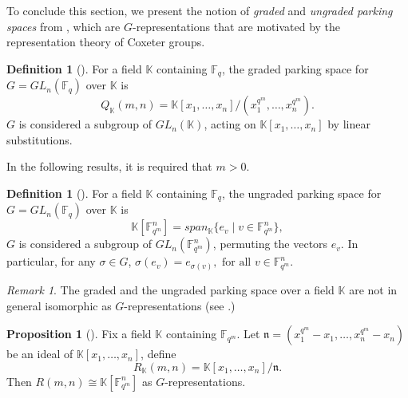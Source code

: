 \documentclass[12pt,a4paper]{report}
\theoremstyle{definition}
\newtheorem{definition}[theorem]{Definition}
\newtheorem{proposition}[theorem]{Proposition}
\theoremstyle{remark}
\newtheorem*{remark}{Remark}
\theoremstyle{definition}
\begin{document}
To conclude this section, we present the notion of \emph{graded} and \emph{ungraded parking spaces} from \cite[Section 6]{Lewis_Reiner_Stanton_2017}, which are $G$-representations that are motivated by the representation theory of Coxeter groups. 
\begin{definition}[{\cite[Definition 6.1]{Lewis_Reiner_Stanton_2017}}]\label{def:graded_parking_spaces}
    For a field $\mathbb{K}$ containing $\mathbb{F}_q$, the graded parking space for $G = GL_n(\mathbb{F}_q)$ over $\mathbb{K}$ is 
    \begin{equation*}
        Q_{\mathbb{K}}(m, n) = \mathbb{K}[x_1, \ldots, x_n]/(x_1^{q^m}, \ldots, x_n^{q^m}).
    \end{equation*}
    $G$ is considered a subgroup of $GL_n(\mathbb{K})$, acting on $\mathbb{K}[x_1, \ldots, x_n]$ by linear substitutions. 
\end{definition}
In the following results, it is required that $m>0$.
\begin{definition}[{\cite[Definition 6.2]{Lewis_Reiner_Stanton_2017}}]\label{def:ungraded_parking_spaces}
    For a field $\mathbb{K}$ containing $\mathbb{F}_q$, the ungraded parking space for $G = GL_n(\mathbb{F}_q)$ over $\mathbb{K}$ is 
    \begin{equation*}
        \mathbb{K}[\mathbb{F}_{q^m}^{n}] = span_{\mathbb{K}}\{e_v\mid v\in \mathbb{F}_{q^m}^{n}\},
    \end{equation*}
    $G$ is considered a subgroup of $GL_n(\mathbb{F}_{q^m}^{n})$, permuting the vectors $e_v$. In particular, for any $\sigma\in G$, $\sigma(e_v) = e_{\sigma(v)}, \text{ for all } v\in \mathbb{F}_{q^m}^{n}$.
\end{definition}
\begin{remark}
    The graded and the ungraded parking space over a field $\mathbb{K}$ are not in general isomorphic as $G$-representations (see \cite[Example 6.4]{Lewis_Reiner_Stanton_2017}.)
\end{remark}
\begin{proposition}[{\cite[Proposition 6.9]{Lewis_Reiner_Stanton_2017}}]\label{prop:ungraded_is_iso_to_R_k}
    Fix a field $\mathbb{K}$ containing $\mathbb{F}_{q^m}$. Let $\mathfrak{n} = (x_1^{q^m}-x_1, \ldots, x_n^{q^m}-x_n)$ be an ideal of $\mathbb{K}[x_1, \ldots, x_n]$, define
    \begin{equation*}
        R_{\mathbb{K}}(m, n) = \mathbb{K}[x_1, \ldots, x_n]/\mathfrak{n}.
    \end{equation*}
    Then $R(m, n)\cong \mathbb{K}[\mathbb{F}_{q^m}^{n}]$ as $G$-representations.
\end{proposition}
\end{document}
